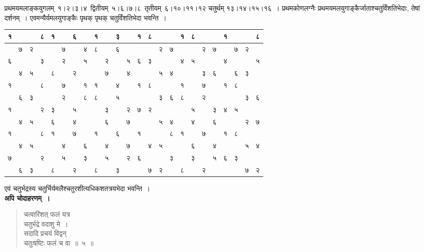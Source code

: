 \documentclass[11pt, openany]{book}
\begin{document}
\newpage

प्रथमयमलाङ्कयुगलम् \,१।२।३।४ \,द्वितीयम् \,५।६।७।८ \,तृतीयम् \,६।१०।११।१२ चतुर्थम् १३।१४।१५।१६~। प्रथमकोणलग्नैः प्रथमयमलयुगाङ्कैर्जाताश्चतुर्विंशतिभेदाः, तेषां दर्शनम्~। एवमन्यैर्यमलयुगाङ्कैः पृथक् पृथक् चतुर्विंशतिभेदा भवन्ति~।

\begin{table}[h]
	\centering
	\setlength{\extrarowheight}{2.5pt} \setlength{\tabcolsep}{3pt}

\noindent \begin{tabular}{||c|c|c|c||c|c|c|c||c|c|c|c||c|c|c|c||c|c|c|c||c|c|c|c||}
	\hline\hline
  १ &  &  &  ८ & १  &  & ६ &   & १ &  & ३ &  & १ & ८ &  &  & १ & ८ &  &  & १ & & &  ८\\  
\hline 
 & ७ & २ &   &   & ७  &  & ४  & ८ &   &६ &  & &  & २ &७  &  &  & २  & ७ &  & ७& २& \\  
\hline 
६ & &  &३   &  & २ &  & ५ &  & २ &  & ५ &६ & ३&  & & ४&  ५&  &  & ४ & & & ५ \\
\hline
 & ४ & ५ & & ८ & & २ & &   & ७ & & ४ &  &  &५ & ४&  &  & ३& ६ &  & ६& ३ &  \\
\hline\hline
 १ &  &  &  ८ &   & ७  &  & १  & १&   & ४  &   & १ & ८ &  &   &१  &  & ७ &  & १ & ८& & \\  
\hline 
 & ६ & ३ &  &   & २  &  & ८  & ८ &   & ५  &   &  &  & ३ &६   &८  &  & २ &  &  & & ३& ६\\  
\hline 
१ &  &  &  २ &  ३ &   & ५ &   & & ३   &   & २  & ७& २ &  &   &  & ५ & & ३ & ४ & ५& & \\  
\hline 
 & ४ & ५  &    &६ &  &४ & & & ६ &  & ७ & & & ५ & ४ & & ४ & & ६ &  & & २ &  ७ \\
\hline\hline
१ & & & ८  & १ & & ७ & & १ & & ६ & & १ & & & ८ & १ & & ७ &  & १ & ८ & & \\
\hline
 & ४ & ५ & & & ४ & & ६ & & ४ & & ७ & &४ &५ &  & & ६ & &४ & & & ५ & ४ \\
\hline
७ & & & २ & & ५ & & ३ & & ५ & & २ & ६ & & & ३ & & ३ &  & ५& ६ & ३ & &\\
\hline
& ६ & ३ & & ८ & & २ & & ८ & & ३ & & & ७& २ & & ८ & & २ & & && ७ & २\\
\hline 
\end{tabular}
\end{table}

एवं चतुर्भद्रस्य चतुर्भिर्यमलैश्चतुरशीत्यधिकशतत्रयभेदा भवन्ति~।\\

\textbf{अपि चोदाहरणम्~।}

\begin{quote}
{\ex चत्वारिंशत् फलं यत्र\\
चतुर्भद्रे वदाशु मे~।\\
सदादि प्रचयं विद्वन्\\
चतुःषष्टिः फलं च वा~॥~५~॥}
\end{quote}
\end{document}
